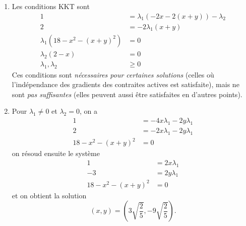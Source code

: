 \begin{enumerate}
\begin{solution}
\begin{enumerate}
      \item Les conditions KKT sont
      \begin{align*}
        1 &= \lambda_1 (-2x -2(x+y))  - \lambda_2 \\
        2 &= -2\lambda_1 (x+y) \\
        \lambda_1 (18 - x^2 - (x+y)^2) &= 0 \\
        \lambda_2 (2-x) &= 0 \\
        \lambda_1 , \lambda_2 &\geq 0
      \end{align*}
      Ces conditions sont \emph{nécessaires pour certaines solutions} 
      (celles où l'indépendance des gradients des contraites actives
      est satisfaite),
      mais ne sont \emph{pas suffisantes}
      (elles peuvent aussi être satisfaites en d'autres points).
      
      \item Pour $\lambda_1 \neq 0$ et $\lambda_2 = 0$, on a
      \begin{align*}
        1 &= -4x \lambda_1 - 2y \lambda_1 \\
        2 &= -2x \lambda_1 - 2y \lambda_1 \\
        18 - x^2 - (x+y)^2 &= 0
      \end{align*}
      on résoud ensuite le système
      \begin{align*}
        1 &= 2x \lambda_1 \\
        -3 &= 2y \lambda_1 \\
        18 - x^2 - (x+y)^2 &= 0
      \end{align*}
      et on obtient la solution
      \[ (x,y) = \left( 3\sqrt{\frac{2}{5}}, -9 \sqrt{\frac{2}{5}} \right). \]
    \end{enumerate}
    
  \end{solution}
  
  
  
  
  
\end{enumerate}